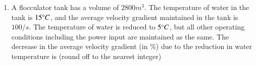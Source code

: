 \documentclass[journal]{IEEEtran}
\begin{document}
\begin{enumerate}
		\begin{table}[h!]    	
    			\centering
    			 
		\end{table}
	\item
	A flocculator tank has a volume of $2800 m^3$. The temperature of water in the tank is $15 \degree C$, and the average velocity gradient maintained in the tank is $100/s$. The temperature of water is reduced to $5 \degree C$, but all other operating conditions including the power input are maintained as the same. The decrease in the average velocity gradient (in \%) due to the reduction in water temperature is (round off to the nearest integer)\\
\end{enumerate}	
\end{document}
